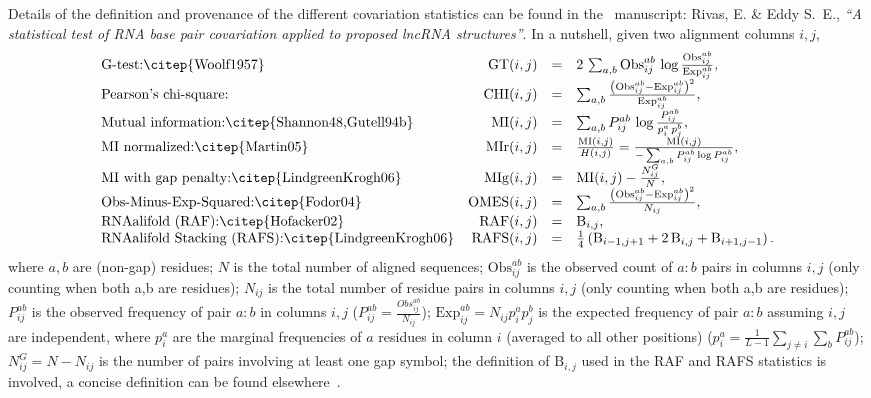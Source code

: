 Details of the definition and provenance of the different covariation
statistics can be found in the \rscape\ manuscript: Rivas, E. \& Eddy
S.~E., \textit{``A statistical test of RNA base pair covariation
  applied to proposed lncRNA structures''}. In a nutshell, given two
alignment columns $i,j$,
%
\[
\begin{array}{lrcl}
  \mbox{G-test:\citep{Woolf1957}}                                       & \mathrm{GT}(i,j)   & = & 2 \, \sum_{a,b} \mathrm{Obs}^{ab}_{ij} \, \log \frac{ \mathrm{Obs}^{ab}_{ij} } { \mathrm{Exp}^{ab}_{ij} }, \\
  \mbox{Pearson's chi-square:}                                          & \mathrm{CHI}(i,j)  & = &      \sum_{a,b} \frac{ \left(\mathrm{Obs}^{ab}_{ij} - \mathrm{Exp}^{ab}_{ij}\right)^2 }{\mathrm{Exp}^{ab}_{ij}},\\ 
  \mbox{Mutual information:\citep{Shannon48,Gutell94b}}                 & \mathrm{MI}(i,j)   & = &      \sum_{a,b} P^{ab}_{ij} \, \log \frac{ P^{ab}_{ij} }{ p^{a}_{i} \, p^{b}_{j}},                       \\
  \mbox{MI normalized:\citep{Martin05}}                                 & \mathrm{MIr}(i,j)  & = & \frac{\mathrm{MI}(i,j)} {H(i,j)} = \frac{\mathrm{MI}(i,j)} { -\sum_{a,b} P^{ab}_{ij} \log  P^{ab}_{ij}},        \\
  \mbox{MI with gap penalty:\citep{LindgreenKrogh06}}                   & \mathrm{MIg}(i,j)  & = & \mathrm{MI}(i,j) - \frac{N^G_{ij}} {N},                                                                   \\
  \mbox{Obs-Minus-Exp-Squared:\citep{Fodor04}}                          & \mathrm{OMES}(i,j) & = &      \sum_{a,b} \frac{ \left(\mathrm{Obs}^{ab}_{ij} - \mathrm{Exp}^{ab}_{ij}\right)^2 }{N_{ij}},                \\
  \mbox{RNAalifold (RAF):\citep{Hofacker02}}                            & \mathrm{RAF}(i,j)  & = & \mathrm{B}_{i,j},                                      \\
  \mbox{RNAalifold Stacking (RAFS):\citep{LindgreenKrogh06}}            & \mathrm{RAFS}(i,j) & = & \frac{1}{4}\left(\mathrm{B}_{i-1,j+1}+2\,\mathrm{B}_{i,j}+\mathrm{B}_{i+1,j-1}\right).                                      \\
\end{array}
\]
%
\noindent
where $a,b$ are (non-gap) residues; $N$ is the total number of aligned
sequences; $\mathrm{Obs}^{ab}_{ij}$ is the observed count of $a:b$
pairs in columns $i,j$ (only counting when both a,b are residues);
$N_{ij}$ is the total number of residue pairs in columns $i,j$ (only
counting when both a,b are residues); $P^{ab}_{ij}$ is the observed
frequency of pair $a:b$ in columns $i,j$
($P^{ab}_{ij}=\frac{Obs^{ab}_{ij}}{N_{ij}}$); $\mathrm{Exp}^{ab}_{ij}=
N_{ij} p^a_ip^b_j$ is the expected frequency of pair $a:b$ assuming
$i,j$ are independent, where $p^a_i$ are the marginal frequencies of
$a$ residues in column $i$ (averaged to all other positions) ($p^a_i
= \frac{1}{L-1}\sum_{j\neq i} \sum_b P^{ab}_{ij}$); $N^G_{ij} = N -
N_{ij}$ is the number of pairs involving at least one gap symbol; the
definition of $\mathrm{B}_{i,j}$ used in the RAF and RAFS statistics
is involved, a concise definition can be found
elsewhere~\citep{LindgreenKrogh06}.

